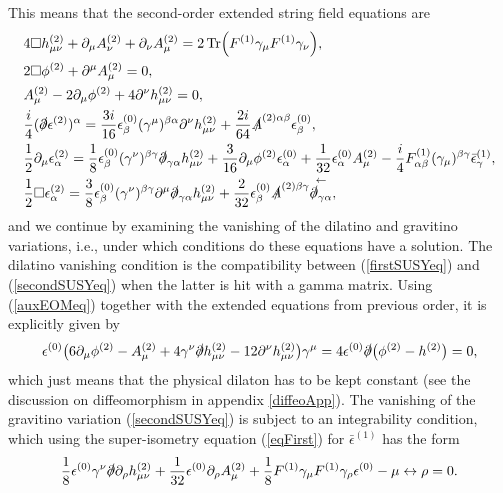 \documentclass[12pt]{article}
\def\be{\begin{equation}}
\def\ee{\end{equation}}
\numberwithin{equation}{section}
\newcommand{\B}[1]{\bar{#1}}
\begin{document}
This means that the second-order extended string field equations are
\begin{align}
	\label{curvatureEq}
	&4\Box h^{(2)}_{\mu\nu} + \partial_\mu A^{(2)}_{\nu} + \partial_\nu A^{(2)}_\mu = 2 \Tr (F^{(1)} \gamma_\mu F^{(1)} \gamma_\nu), \\        \label{boxEq}
	&2\Box\phi^{(2)} + \partial^\mu A^{(2)}_\mu = 0, \\
	\label{auxEOMeq}
	&A^{(2)}_\mu - 2\partial_\mu\phi^{(2)} + 4\partial^\nu h^{(2)}_{\mu\nu} = 0, \\
	\label{firstSUSYeq}
	&\frac{i}{4} (\slashed{\partial}\epsilon^{(2)})^\alpha = \frac{3i}{16} \epsilon^{(0)}_{\beta}(\gamma^\mu)^{\beta \alpha} \partial^\nu h^{(2)}_{\mu\nu}  + \frac{2 i}{64} \slashed{A}^{(2)\alpha \beta} \epsilon^{(0)}_{ \beta}, \\
	\label{secondSUSYeq}
	&\frac{1}{2}\partial_\mu \epsilon^{(2)}_{\alpha} = \frac{1}{8} \epsilon^{(0)}_{\beta}(\gamma^\nu)^{\beta \gamma} \slashed{\partial}_{\gamma \alpha} h^{(2)}_{\mu\nu} + \frac{3}{16} \partial_\mu \phi^{(2)} \epsilon^{(0)}_{\alpha} + \frac{1}{32} \epsilon^{(0)}_{\alpha} A^{(2)}_\mu -\frac{i}{4} F^{(1)}_{\alpha \beta}(\gamma_{\mu})^{\beta\gamma}\B{\epsilon}^{(1)}_{\gamma},\\
	&\frac{1}{2} \Box \epsilon^{(2)}_{\alpha} = \frac{3}{8}\epsilon^{(0)}_{\beta}(\gamma^\nu)^{\beta \gamma} \partial^\mu \slashed{\partial}_{ \gamma\alpha} h^{(2)}_{\mu\nu} + \frac{2}{32} \epsilon^{(0)}_{ \beta} \slashed{A}^{(2)\beta\gamma}  \overset{\leftarrow}{\slashed{\partial}_{ \gamma \alpha}},
\end{align}
and we continue by examining the vanishing of the dilatino and gravitino variations, i.e., under which conditions do these equations have a solution. The dilatino vanishing condition is the compatibility between (\ref{firstSUSYeq}) and (\ref{secondSUSYeq}) when the latter is hit with a gamma matrix. Using (\ref{auxEOMeq}) together with the extended equations from previous order, it is explicitly given by
\be
\epsilon^{(0)} \big(6 \partial_\mu \phi^{(2)} - A^{(2)}_\mu + 4\gamma^\nu\slashed{\partial}  h^{(2)}_{\mu \nu} - 12 \partial^\nu h^{(2)}_{\mu \nu}\big)\gamma^\mu  = 4 \epsilon^{(0)} \slashed{\partial}\big(\phi^{(2)} - h^{(2)}\big) = 0,
\label{dilatonEq}
\ee
which just means that the physical dilaton has to be kept constant (see the discussion on diffeomorphism in appendix \ref{diffeoApp}). The vanishing of the gravitino variation (\ref{secondSUSYeq}) is subject to an integrability condition, which using the super-isometry equation (\ref{eqFirst}) for $\bar{\epsilon}^{(1)}$ has the form
\be
\frac{1}{8} \epsilon^{(0)} \gamma^\nu \slashed{\partial} \partial_\rho h^{(2)}_{ \mu \nu} + \frac{1}{32} \epsilon^{(0)} \partial_\rho A^{(2)}_\mu + \frac{1}{8} F^{(1)} \gamma_\mu F^{(1)} \gamma_\rho \epsilon^{(0)} - \mu \leftrightarrow \rho = 0.
\label{integrEq}
\ee
\end{document}
